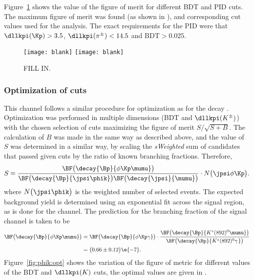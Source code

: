 Figure~\ref{fig:kpipi:opt} shows the value of the figure of merit for different BDT and PID cuts.
The maximum figure of merit
was found (as shown in ), and corresponding cut values used for the analysis.
The exact requirements for the PID were that $\dllkpi(\Kp)>3.5$, $\dllkpi(\pi^\pm)<14.5$ and
$\mathrm{BDT}>0.025$.

\begin{figure}
  \begin{center}
    \texttt{[image: blank]}
    \texttt{[image: blank]}
    \caption{\small
      FILL IN.
    }
    \label{fig:kpipi:opt}
  \end{center}
\end{figure}


\subsubsection[Optimization of \btophikmumu cuts]
{Optimization of \tmath{\btophikmumu} cuts}
This channel follows a similar procedure for optimization as for the decay \btokpipimumu.
Optimization was performed in multiple dimensions (BDT and $\dllkpi(K^\pm)$) with the chosen
selection of cuts maximizing the figure of merit $S/\sqrt{S+B}$.
The calculation of $B$ was made in the same way as described above, and the
value of $S$ was determined in a similar way, by scaling the \emph{sWeighted} sum of candidates
that passed given cuts by the ratio of known branching fractions.
Therefore,
\begin{equation}
  S =
  \frac{
    \BF\big(\decay{\Bp}{\phi\Kp\mumu}\big)
  }{
    \BF\big(\decay{\Bp}{\jpsi\phik}\big)
    \BF\big(\decay{\jpsi}{\mumu}\big)
  }
  \cdot
  N\big(\jpsi\phi\Kp\big).
\end{equation}
where $N\big(\jpsi\phik\big)$ is the weighted number of selected \btojpsiphik events.
The expected background yield is determined using an exponential fit across the signal region, as
is done for the \btokpipimumu channel.
The prediction for the branching fraction of the signal channel is taken to be
\begin{align}
  \BF\big(\decay{\Bp}{\phi\Kp\mumu}\big)
  &=
  \BF\big(\decay{\Bp}{\phi\Kp\gamma}\big)
  \cdot\frac{
    \BF\big(\decay{\Bp}{K^*(892)^0\mumu}\big)
  }{
    \BF\big(\decay{\Bp}{K^*(892)^0\gamma^{}}\big)
  }\nonumber\\
  &=\big(0.66\pm0.12\big)\e{-7}.
\end{align}
Figure~\ref{fig:phik:opt} shows the variation of the figure of metric for different values of the
BDT and $\dllkpi(K)$ cuts, the optimal values are given in .

